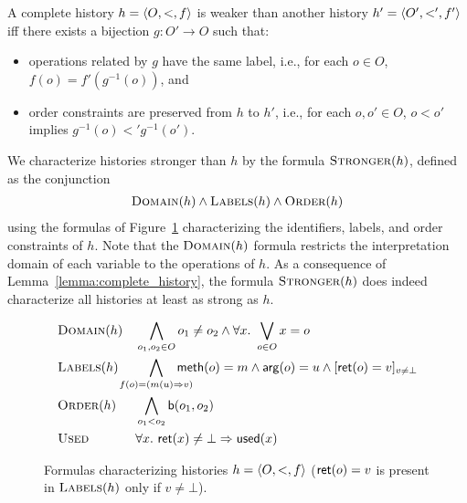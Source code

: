 \begin{lemma}
  \label{lemma:complete_history}

  A complete history $h={\langle{O,<,f}\rangle}$ is weaker than another history
  $h'={\langle{O',<',f'}\rangle}$ iff there exists a bijection $g:O' \to O$ such that:

  \begin{itemize}

    \item operations related by $g$ have the same label, i.e., for each $o\in O$, $f(o)=f'(g^{-1}(o))$, and

    \item order constraints are preserved from $h$ to $h'$, i.e., for each $o,o'\in O$, $o< o'$ implies $g^{-1}(o)<' g^{-1}(o')$.


  \end{itemize}

\end{lemma}

We characterize histories stronger than $h$ by the formula $\textsc{Stronger}(h)$, defined as
the conjunction
\begin{align*}
  \textsc{Domain}(h) \land \textsc{Labels}(h) \land \textsc{Order}(h)
\end{align*}
using the formulas of Figure~\ref{fig:formula:history} characterizing the
identifiers, labels, and order constraints of $h$. Note that
the $\textsc{Domain}(h)$ formula restricts the interpretation domain of each
variable to the operations of $h$. As a consequence of
Lemma~\ref{lemma:complete_history}, the formula $\textsc{Stronger}(h)$ does
indeed characterize all histories at least as strong as $h$.

\begin{figure}
  \footnotesize
  \begin{align*}
    & \textsc{Domain}(h)
    && \bigwedge_{o_1, o_2 \in O} o_1 \neq o_2 \land \forall x.\ \bigvee_{o\in O} x = o \\
    & \textsc{Labels}(h)
    && \hspace{-5mm} \bigwedge_{f(o) = (m(u) \Rightarrow v)}
      \hspace{-5mm}
      {\sf meth}(o) = m \land {\sf arg}(o) = u \land 
      [{\sf ret}(o) = v]_{v \neq \bot} \\
    & \textsc{Order}(h)
    && \bigwedge_{o_1 < o_2} {\sf b}(o_1, o_2) \\
    & \textsc{Used} 
    && \forall x.\ {\sf ret}(x) \neq \bot \implies {\sf used}(x)
  \end{align*}
  \caption{Formulas characterizing histories $h = {\langle{O,<,f}\rangle}$ (${\sf ret}(o) = v$
  is present in $\textsc{Labels}(h)$ only if $v\neq \bot$).}
  \label{fig:formula:history}
\end{figure}

